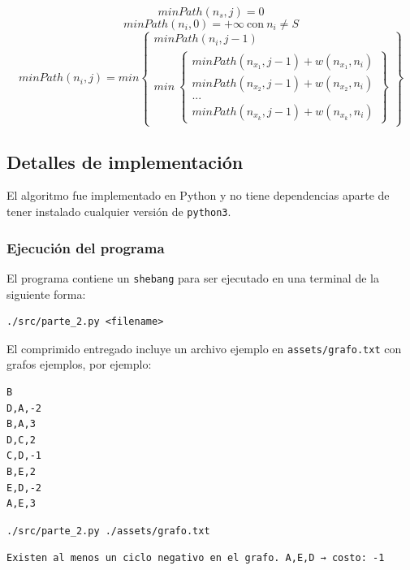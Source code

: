 \documentclass[titlepage,a4paper]{article}
\begin{document}
$$minPath(n_s, j) = 0$$
$$minPath(n_i, 0) = +\infty\ \text{con}\ n_i \neq S$$
$$
minPath(n_i, j) = min \left\{\begin{array}{lcc}
                        minPath(n_i, j-1) \\
                        min\ \left\{\begin{array}{lcc}
                               minPath(n_x_1, j-1) + w(n_x_1,n_i) \\
                               minPath(n_x_2, j-1) + w(n_x_2,n_i) \\
                               ... \\
                               minPath(n_x_k, j-1) + w(n_x_k,n_i)
                             \end{array}\right\}
                      \end{array}\right\}
$$

\subsection{Detalles de implementación}
\label{sec:orgdf88c7c}

El algoritmo fue implementado en Python y no tiene dependencias aparte de tener
instalado cualquier versión de \texttt{python3}.

\subsubsection{Ejecución del programa}
\label{sec:org842d1ab}

El programa contiene un \texttt{shebang} para ser ejecutado en una terminal de la
siguiente forma:

\begin{verbatim}
./src/parte_2.py <filename>
\end{verbatim}

El comprimido entregado incluye un archivo ejemplo en \texttt{assets/grafo.txt} con grafos ejemplos,
por ejemplo:

\begin{verbatim}
B
D,A,-2
B,A,3
D,C,2
C,D,-1
B,E,2
E,D,-2
A,E,3
\end{verbatim}

\begin{verbatim}
./src/parte_2.py ./assets/grafo.txt
\end{verbatim}

\begin{verbatim}
Existen al menos un ciclo negativo en el grafo. A,E,D → costo: -1
\end{verbatim}
\end{document}
